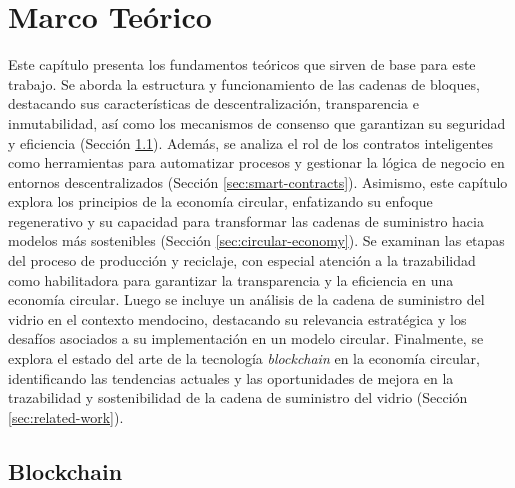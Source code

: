 \chapter[Marco teórico]{Marco Teórico}
\label{cp:theoretical-framework}

\parindent0pt

Este capítulo presenta los fundamentos teóricos que sirven de base para este trabajo. Se aborda la estructura y funcionamiento de las cadenas de bloques, destacando sus características de descentralización, transparencia e inmutabilidad, así como los mecanismos de consenso que garantizan su seguridad y eficiencia (Sección \ref{sec:blockchain}). Además, se analiza el rol de los contratos inteligentes como herramientas para automatizar procesos y gestionar la lógica de negocio en entornos descentralizados (Sección \ref{sec:smart-contracts}). Asimismo, este capítulo explora los principios de la economía circular, enfatizando su enfoque regenerativo y su capacidad para transformar las cadenas de suministro hacia modelos más sostenibles (Sección \ref{sec:circular-economy}). Se examinan las etapas del proceso de producción y reciclaje, con especial atención a la \gls{trazabilidad} como habilitadora para garantizar la transparencia y la eficiencia en una economía circular. Luego se incluye un análisis de la cadena de suministro del vidrio en el contexto mendocino, destacando su relevancia estratégica y los desafíos asociados a su implementación en un modelo circular. Finalmente, se explora el estado del arte de la tecnología \textit{blockchain} en la economía circular, identificando las tendencias actuales y las oportunidades de mejora en la trazabilidad y \gls{sostenibilidad} de la cadena de suministro del vidrio (Sección \ref{sec:related-work}).

\section{Blockchain}
\label{sec:blockchain}


